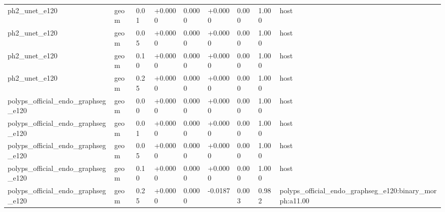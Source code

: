 \begin{table}[t]
\begin{tabular}{lllllllll}
ph2\_unet\_e120 & geom & 0.01 & +0.0000 & 0.0000 & +0.0000 & 0.000 & 1.000 & host \\
ph2\_unet\_e120 & geom & 0.05 & +0.0000 & 0.0000 & +0.0000 & 0.000 & 1.000 & host \\
ph2\_unet\_e120 & geom & 0.10 & +0.0000 & 0.0000 & +0.0000 & 0.000 & 1.000 & host \\
ph2\_unet\_e120 & geom & 0.25 & +0.0000 & 0.0000 & +0.0000 & 0.000 & 1.000 & host \\
polyps\_official\_endo\_graphseg\_e120 & geom & 0.00 & +0.0000 & 0.0000 & +0.0000 & 0.000 & 1.000 & host \\
polyps\_official\_endo\_graphseg\_e120 & geom & 0.01 & +0.0000 & 0.0000 & +0.0000 & 0.000 & 1.000 & host \\
polyps\_official\_endo\_graphseg\_e120 & geom & 0.05 & +0.0000 & 0.0000 & +0.0000 & 0.000 & 1.000 & host \\
polyps\_official\_endo\_graphseg\_e120 & geom & 0.10 & +0.0000 & 0.0000 & +0.0000 & 0.000 & 1.000 & host \\
polyps\_official\_endo\_graphseg\_e120 & geom & 0.25 & +0.0000 & 0.0000 & -0.0187 & 0.003 & 0.982 & polyps\_official\_endo\_graphseg\_e120:binary\_morph:a11.00 \\
\bottomrule
\end{tabular}
\end{table}
